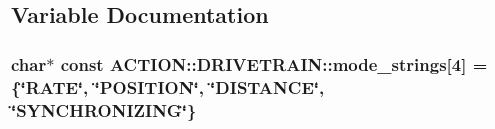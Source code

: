 \subsection{\-Variable \-Documentation}
\hypertarget{namespace_a_c_t_i_o_n_1_1_d_r_i_v_e_t_r_a_i_n_af7f3dbf3458d52145ba68c97ed370713}{
\subsubsection[{mode\-\_\-strings}]{\setlength{\rightskip}{0pt plus 5cm}char$\ast$ const {\bf \-A\-C\-T\-I\-O\-N\-::\-D\-R\-I\-V\-E\-T\-R\-A\-I\-N\-::mode\-\_\-strings}\mbox{[}4\mbox{]} = \{\char`\"{}\-R\-A\-T\-E\char`\"{}, \char`\"{}\-P\-O\-S\-I\-T\-I\-O\-N\char`\"{}, \char`\"{}\-D\-I\-S\-T\-A\-N\-C\-E\char`\"{}, \char`\"{}\-S\-Y\-N\-C\-H\-R\-O\-N\-I\-Z\-I\-N\-G\char`\"{}\}}}
\label{namespace_a_c_t_i_o_n_1_1_d_r_i_v_e_t_r_a_i_n_af7f3dbf3458d52145ba68c97ed370713}
